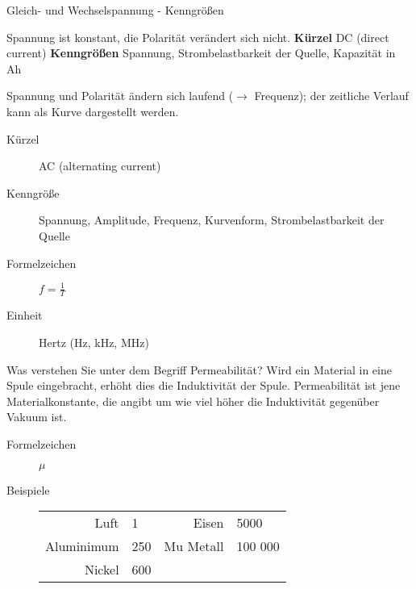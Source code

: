 \documentclass[avery5371,grid,frame,a4paper]{flashcards}
\newcommand{\card}[3]{
  \begin{flashcard}[{\chap} -- #1]{#2}#3\end{flashcard}
}
\begin{document}
\card{09}{Gleich- und Wechselspannung - Kenngrößen}{
  \scriptsize
  \begin{description}\itemsep0pt
    \item[Gleichspannung] Spannung ist konstant, die Polarität verändert sich nicht. \textbf{Kürzel} DC (direct current) \textbf{Kenngrößen} Spannung, Strombelastbarkeit der Quelle, Kapazität in Ah
    \item[Wechselspannung]\itemsep0pt
      Spannung und Polarität ändern sich laufend ($\rightarrow$ Frequenz); der zeitliche Verlauf kann als Kurve dargestellt werden. 
      \begin{description}
        \item[Kürzel] AC (alternating current)
        \item[Kenngröße] Spannung, Amplitude, Frequenz, Kurvenform, Strombelastbarkeit der Quelle
        \item[Formelzeichen] $f = \frac1T$
        \item[Einheit] Hertz (Hz, kHz, MHz)
      \end{description}
  \end{description}
}


\card{10}{Was verstehen Sie unter dem Begriff Permeabilität?}{
  Wird ein Material in eine Spule eingebracht, erhöht dies die Induktivität der Spule.
  Permeabilität ist jene Materialkonstante, die angibt um wie viel höher die Induktivität
  gegenüber Vakuum ist.
  \begin{description}
    \item[Formelzeichen] $\mu$
    \item[Beispiele]
      \begin{tabular}{rlrl}
        Luft       & 1      & Eisen      & 5000 \\
        Aluminimum & 250    & Mu Metall  & 100 000 \\
        Nickel     & 600    &            & \\
      \end{tabular}
  \end{description}
}
\end{document}
